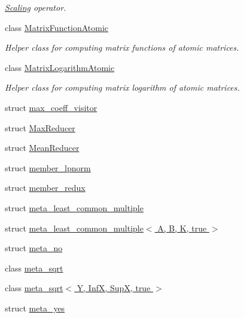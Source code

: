 \begin{DoxyCompactItemize}
\begin{DoxyCompactList}\small\item\em \hyperlink{class_scaling}{Scaling} operator. \end{DoxyCompactList}\item 
class \hyperlink{class_eigen_1_1internal_1_1_matrix_function_atomic}{Matrix\+Function\+Atomic}
\begin{DoxyCompactList}\small\item\em Helper class for computing matrix functions of atomic matrices. \end{DoxyCompactList}\item 
class \hyperlink{class_eigen_1_1internal_1_1_matrix_logarithm_atomic}{Matrix\+Logarithm\+Atomic}
\begin{DoxyCompactList}\small\item\em Helper class for computing matrix logarithm of atomic matrices. \end{DoxyCompactList}\item 
struct \hyperlink{struct_eigen_1_1internal_1_1max__coeff__visitor}{max\+\_\+coeff\+\_\+visitor}
\item 
struct \hyperlink{struct_eigen_1_1internal_1_1_max_reducer}{Max\+Reducer}
\item 
struct \hyperlink{struct_eigen_1_1internal_1_1_mean_reducer}{Mean\+Reducer}
\item 
struct \hyperlink{struct_eigen_1_1internal_1_1member__lpnorm}{member\+\_\+lpnorm}
\item 
struct \hyperlink{struct_eigen_1_1internal_1_1member__redux}{member\+\_\+redux}
\item 
struct \hyperlink{struct_eigen_1_1internal_1_1meta__least__common__multiple}{meta\+\_\+least\+\_\+common\+\_\+multiple}
\item 
struct \hyperlink{struct_eigen_1_1internal_1_1meta__least__common__multiple_3_01_a_00_01_b_00_01_k_00_01true_01_4}{meta\+\_\+least\+\_\+common\+\_\+multiple$<$ A, B, K, true $>$}
\item 
struct \hyperlink{struct_eigen_1_1internal_1_1meta__no}{meta\+\_\+no}
\item 
class \hyperlink{class_eigen_1_1internal_1_1meta__sqrt}{meta\+\_\+sqrt}
\item 
class \hyperlink{class_eigen_1_1internal_1_1meta__sqrt_3_01_y_00_01_inf_x_00_01_sup_x_00_01true_01_4}{meta\+\_\+sqrt$<$ Y, Inf\+X, Sup\+X, true $>$}
\item 
struct \hyperlink{struct_eigen_1_1internal_1_1meta__yes}{meta\+\_\+yes}
\item 

\end{DoxyCompactItemize}
